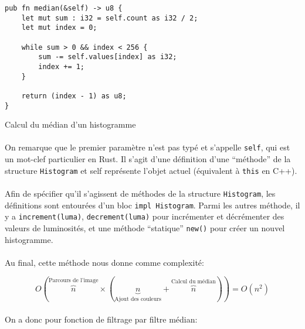 \documentclass{report}
\begin{document}
\begin{listing}[H]
\begin{verbatim}
pub fn median(&self) -> u8 {
	let mut sum : i32 = self.count as i32 / 2;
	let mut index = 0;

	while sum > 0 && index < 256 {
	    sum -= self.values[index] as i32;
	    index += 1;
	}

	return (index - 1) as u8;
}
\end{verbatim}
\label{tab:hist_median}
\caption{Calcul du médian d'un histogramme}
\end{listing}

\paragraph{} On remarque que le premier paramètre n'est pas typé et s'appelle
\texttt{self}, qui est un mot-clef particulier en Rust. Il s'agit
d'une définition d'une ``méthode'' de la structure \texttt{Histogram}
et self représente l'objet actuel (équivalent à \texttt{this} en C++).

\paragraph{} Afin de spécifier qu'il s'agissent de méthodes de la structure
\texttt{Histogram}, les définitions sont entourées d'un bloc
\texttt{impl Histogram}. Parmi les autres méthode, il y a
\texttt{increment(luma)}, \texttt{decrement(luma)} pour
incrémenter et décrémenter des valeurs de luminosités, et une méthode
``statique'' \texttt{new()} pour créer un nouvel histogramme.

\paragraph{} Au final, cette méthode nous donne comme complexité:

\[
	O\left(\overbrace{n}^\text{Parcours de l'image} \times
	  \left(\underbrace{n}_\text{Ajout des couleurs} +
	  \overbrace{n}^\text{Calcul du médian}\right)\right) = O(n^2)
\]

\paragraph{} On a donc pour fonction de filtrage par filtre médian:
\end{document}
